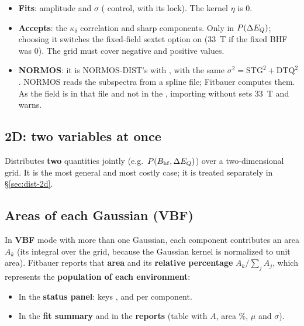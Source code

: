 \begin{itemize}[nosep]
  \item \textbf{Fits}: amplitude and $\sigma$ ( control,
        with its lock). The kernel $\eta$ is 0.
  \item \textbf{Accepts}: the $\kappa_\delta$ correlation and sharp components.
        Only in $P(\Delta E_{Q})$; choosing it switches the fixed-field sextet option
        on (33~T if the fixed BHF was 0). The grid must cover negative and
        positive values.
  \item \textbf{NORMOS}: it is NORMOS-DIST's  with
        , with the same $\sigma^2=\mathrm{STG}^2+\mathrm{DTQ}^2$.
        NORMOS reads the subspectra from a spline file; Fitbauer computes them.
        As the field is in that file and not in the , importing
        without  sets 33~T and warns.
\end{itemize}

\subsection{2D: two variables at once}
\label{sec:forma-2d}

Distributes \textbf{two} quantities jointly (e.g.\ $P(B_{\mathrm{hf}},\Delta E_{Q})$) over a
two-dimensional grid. It is the most general and most costly case; it is treated
separately in \S\ref{sec:dist-2d}.

\subsection{Areas of each Gaussian (VBF)}
\label{sec:vbf-areas}

In \textbf{VBF} mode with more than one Gaussian, each component contributes an area
$A_k$ (its integral over the grid, because the Gaussian kernel is normalized to unit
area). Fitbauer reports that \textbf{area} and its \textbf{relative percentage}
$A_k/\sum_j A_j$, which represents the \textbf{population of each environment}:

\begin{itemize}[nosep]
  \item In the \textbf{status panel}: keys ,
         and  per component.
  \item In the \textbf{fit summary} and in the \textbf{reports} (table with $A$,
        area \%, $\mu$ and $\sigma$).
\end{itemize}

